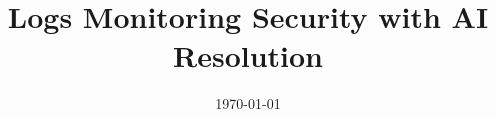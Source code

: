 \documentclass[a4paper, 11pt, oneside]{Thesis}  %
\begin{document}
\frontmatter      %

\title  {Logs Monitoring Security with AI Resolution}
            
\addresses  {\groupname\\\deptname\\\univname}  %
\date       {\today}
\subject    {}
\keywords   {}

\maketitle


\fancyhead{}  %
\rhead{\thepage}  %
\lhead{}  %

\pagestyle{fancy}  %
\end{document}
